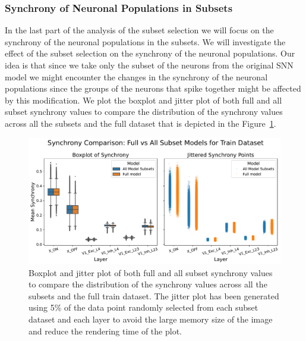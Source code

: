 \subsubsection{Synchrony of Neuronal Populations in Subsets}
\label{subsubsec:neuron_synchrony_subset}
In the last part of the analysis of the subset selection we will focus on the synchrony of the neuronal populations in the subsets. We will investigate the effect of the subset selection on the synchrony of the neuronal populations. Our idea is that since we take only the subset of the neurons from the original SNN model we might encounter the changes in the synchrony of the neuronal populations since the groups of the neurons that spike together might be affected by this modification. We plot the boxplot and jitter plot of both full and all subset synchrony values to compare the distribution of the synchrony values across all the subsets and the full dataset that is depicted in the Figure~\ref{fig:boxplot_synchrony_subset}.

\begin{figure}
    \centering
    \includegraphics[width=\linewidth]{img/plots/synchrony_comparison_subset_full_train.pdf}
    \caption{Boxplot and jitter plot of both full and all subset synchrony values to compare the distribution of the synchrony values across all the subsets and the full train dataset. The jitter plot has been generated using 5\% of the data point randomly selected from each subset dataset and each layer to avoid the large memory size of the image and reduce the rendering time of the plot.}
    \label{fig:boxplot_synchrony_subset}
\end{figure}


